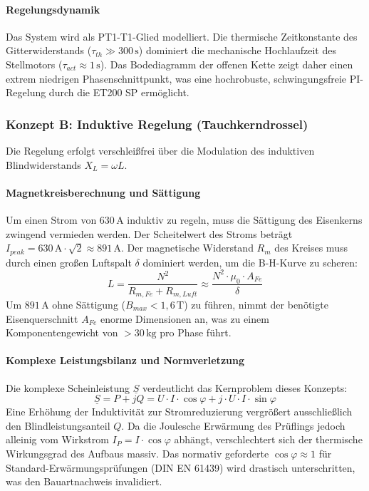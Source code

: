 \paragraph{Regelungsdynamik}
Das System wird als PT1-T1-Glied modelliert. Die thermische Zeitkonstante des Gitterwiderstands ($\tau_{th} \gg 300\,\text{s}$) dominiert die mechanische Hochlaufzeit des Stellmotors ($\tau_{act} \approx 1\,\text{s}$). Das Bodediagramm der offenen Kette zeigt daher einen extrem niedrigen Phasenschnittpunkt, was eine hochrobuste, schwingungsfreie PI-Regelung durch die ET200 SP ermöglicht.

\subsubsection{Konzept B: Induktive Regelung (Tauchkerndrossel)}

Die Regelung erfolgt verschleißfrei über die Modulation des induktiven Blindwiderstands $X_L = \omega L$.
\paragraph{Magnetkreisberechnung und Sättigung}
Um einen Strom von 630\,A induktiv zu regeln, muss die Sättigung des Eisenkerns zwingend vermieden werden. Der Scheitelwert des Stroms beträgt $I_{peak} = 630\,\text{A} \cdot \sqrt{2} \approx 891\,\text{A}$. Der magnetische Widerstand $R_m$ des Kreises muss durch einen großen Luftspalt $\delta$ dominiert werden, um die B-H-Kurve zu scheren:
\begin{equation}
    L = \frac{N^2}{R_{m,Fe} + R_{m,Luft}} \approx \frac{N^2 \cdot \mu_0 \cdot A_{Fe}}{\delta}
\end{equation}
Um $891\,\text{A}$ ohne Sättigung ($B_{max} < 1,6\,\text{T}$) zu führen, nimmt der benötigte Eisenquerschnitt $A_{Fe}$ enorme Dimensionen an, was zu einem Komponentengewicht von $> 30\,\text{kg}$ pro Phase führt.
\paragraph{Komplexe Leistungsbilanz und Normverletzung}
Die komplexe Scheinleistung $\underline{S}$ verdeutlicht das Kernproblem dieses Konzepts:
\begin{equation}
    \underline{S} = P + jQ = U \cdot I \cdot \cos\varphi + j \cdot U \cdot I \cdot \sin\varphi
\end{equation}
Eine Erhöhung der Induktivität zur Stromreduzierung vergrößert ausschließlich den Blindleistungsanteil $Q$. Da die Joulesche Erwärmung des Prüflings jedoch alleinig vom Wirkstrom $I_P = I \cdot \cos\varphi$ abhängt, verschlechtert sich der thermische Wirkungsgrad des Aufbaus massiv. Das normativ geforderte $\cos\varphi \approx 1$ für Standard-Erwärmungsprüfungen (DIN EN 61439) wird drastisch unterschritten, was den Bauartnachweis invalidiert.
